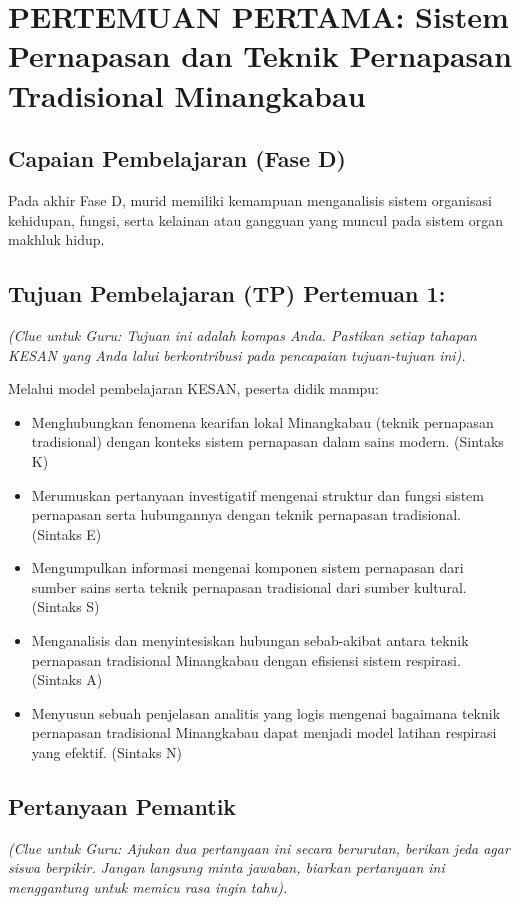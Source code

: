\documentclass[a4paper,12pt]{article}
\begin{document}
\section{PERTEMUAN PERTAMA: Sistem Pernapasan dan Teknik Pernapasan Tradisional Minangkabau}

\subsection{Capaian Pembelajaran (Fase D)}
Pada akhir Fase D, murid memiliki kemampuan menganalisis sistem organisasi kehidupan, fungsi, serta kelainan atau gangguan yang muncul pada sistem organ makhluk hidup.

\subsection{Tujuan Pembelajaran (TP) Pertemuan 1:}
\textit{(Clue untuk Guru: Tujuan ini adalah kompas Anda. Pastikan setiap tahapan KESAN yang Anda lalui berkontribusi pada pencapaian tujuan-tujuan ini).}

Melalui model pembelajaran KESAN, peserta didik mampu:
\begin{itemize}
\item Menghubungkan fenomena kearifan lokal Minangkabau (teknik pernapasan tradisional) dengan konteks sistem pernapasan dalam sains modern. (Sintaks K)
\item Merumuskan pertanyaan investigatif mengenai struktur dan fungsi sistem pernapasan serta hubungannya dengan teknik pernapasan tradisional. (Sintaks E)
\item Mengumpulkan informasi mengenai komponen sistem pernapasan dari sumber sains serta teknik pernapasan tradisional dari sumber kultural. (Sintaks S)
\item Menganalisis dan menyintesiskan hubungan sebab-akibat antara teknik pernapasan tradisional Minangkabau dengan efisiensi sistem respirasi. (Sintaks A)
\item Menyusun sebuah penjelasan analitis yang logis mengenai bagaimana teknik pernapasan tradisional Minangkabau dapat menjadi model latihan respirasi yang efektif. (Sintaks N)
\end{itemize}

\subsection{Pertanyaan Pemantik}
\textit{(Clue untuk Guru: Ajukan dua pertanyaan ini secara berurutan, berikan jeda agar siswa berpikir. Jangan langsung minta jawaban, biarkan pertanyaan ini menggantung untuk memicu rasa ingin tahu).}
\end{document}
